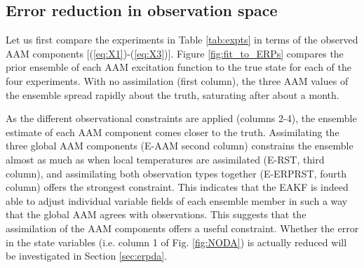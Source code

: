 
\subsection{Error reduction in observation space}

Let us first compare the experiments in Table \ref{tab:expts} in terms of the observed AAM components [(\ref{eq:X1})-(\ref{eq:X3})].
Figure \ref{fig:fit_to_ERPs} compares the prior ensemble of each AAM excitation function to the true state for each of the four experiments. 
With no assimilation (first column), the three AAM values of the ensemble spread rapidly about the truth, saturating after about a month.  

As the different observational constraints are applied (columns 2-4), the ensemble estimate of each AAM component comes closer to the truth. 
Assimilating the three global AAM components (E-AAM second column) constrains the ensemble almost as much as when local temperatures are assimilated (E-RST, third column), and assimilating both observation types together (E-ERPRST, fourth column) offers the strongest constraint.
This indicates that the EAKF is indeed able to adjust individual variable fields of each ensemble member in such a way that the global AAM agrees with observations. 
This suggests that the assimilation of the AAM components offers a useful constraint. 
Whether the error in the state variables (i.e. column 1 of Fig. \ref{fig:NODA}) is actually reduced will be investigated in Section \ref{sec:erpda}.
